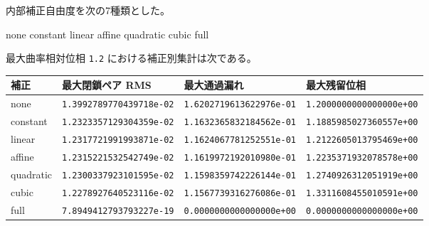 \documentclass[
  a4paper,
]{article}
\newenvironment{Shaded}{}{}
\newcommand{\NormalTok}[1]{#1}
\newcounter{none} %
\begin{document}
内部補正自由度を次の7種類とした。

\begin{Shaded}
\begin{Highlighting}[]
\NormalTok{none}
\NormalTok{constant}
\NormalTok{linear}
\NormalTok{affine}
\NormalTok{quadratic}
\NormalTok{cubic}
\NormalTok{full}
\end{Highlighting}
\end{Shaded}

最大曲率相対位相 \texttt{1.2} における補正別集計は次である。

{\def\LTcaptype{none} %
\begin{longtable}[]{@{}
  >{\raggedright\arraybackslash}p{}
  >{\raggedleft\arraybackslash}p{}
  >{\raggedleft\arraybackslash}p{}
  >{\raggedleft\arraybackslash}p{}@{}}
\toprule\noalign{}
\begin{minipage}[b]{\linewidth}\raggedright
補正
\end{minipage} & \begin{minipage}[b]{\linewidth}\raggedleft
最大閉鎖ペア RMS
\end{minipage} & \begin{minipage}[b]{\linewidth}\raggedleft
最大通過漏れ
\end{minipage} & \begin{minipage}[b]{\linewidth}\raggedleft
最大残留位相
\end{minipage} \\
\midrule\noalign{}
\endhead
\bottomrule\noalign{}
\endlastfoot
none & \texttt{1.3992789770439718e-02} & \texttt{1.6202719613622976e-01}
& \texttt{1.2000000000000000e+00} \\
constant & \texttt{1.2323357129304359e-02} &
\texttt{1.1632365832184562e-01} & \texttt{1.1885985027360557e+00} \\
linear & \texttt{1.2317721991993871e-02} &
\texttt{1.1624067781252551e-01} & \texttt{1.2122605013795469e+00} \\
affine & \texttt{1.2315221532542749e-02} &
\texttt{1.1619972192010980e-01} & \texttt{1.2235371932078578e+00} \\
quadratic & \texttt{1.2300337923101595e-02} &
\texttt{1.1598359742226144e-01} & \texttt{1.2740926312051919e+00} \\
cubic & \texttt{1.2278927640523116e-02} &
\texttt{1.1567739316276086e-01} & \texttt{1.3311608455010591e+00} \\
full & \texttt{7.8949412793793227e-19} & \texttt{0.0000000000000000e+00}
& \texttt{0.0000000000000000e+00} \\
\end{longtable}
}
\end{document}

